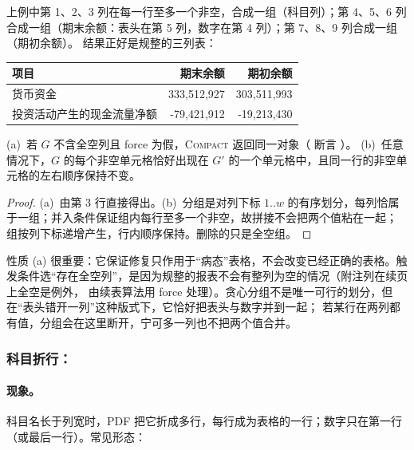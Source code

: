 上例中第 1、2、3 列在每一行至多一个非空，合成一组（科目列）；第 4、5、6 列合成一组（期末余额：表头在第 5 列，数字在第 4 列）；第 7、8、9 列合成一组（期初余额）。
结果正好是规整的三列表：

\begin{center}
\scriptsize
\begin{tabular}{|l|r|r|}
\hline
项目 & 期末余额 & 期初余额 \\ \hline
货币资金 & 333,512,927 & 303,511,993 \\ \hline
投资活动产生的现金流量净额 & -79,421,912 & -19,213,430 \\ \hline
\end{tabular}
\end{center}

\begin{proposition}
\label{prop:ext-compact}
(a)~若 $G$ 不含全空列且 force 为假，\textsc{Compact} 返回同一对象（ 断言 ）。
(b)~任意情况下，$G$ 的每个非空单元格恰好出现在 $G'$ 的一个单元格中，且同一行的非空单元格的左右顺序保持不变。
\end{proposition}
\begin{proof}
(a)~由第 3 行直接得出。(b)~分组是对列下标 $1..w$ 的有序划分，每列恰属于一组；并入条件保证组内每行至多一个非空，故拼接不会把两个值粘在一起；
组按列下标递增产生，行内顺序保持。删除的只是全空组。
\end{proof}

性质 (a) 很重要：它保证修复只作用于“病态”表格，不会改变已经正确的表格。触发条件选“存在全空列”，是因为规整的报表不会有整列为空的情况（附注列在续页上全空是例外，
由续表算法用 force 处理）。贪心分组不是唯一可行的划分，但在“表头错开一列”这种版式下，它恰好把表头与数字并到一起；
若某行在两列都有值，分组会在这里断开，宁可多一列也不把两个值合并。

\subsubsection{科目折行：}
\label{sec:ext-wrap}

\paragraph{现象。}
科目名长于列宽时，PDF 把它折成多行，每行成为表格的一行；数字只在第一行（或最后一行）。常见形态：

